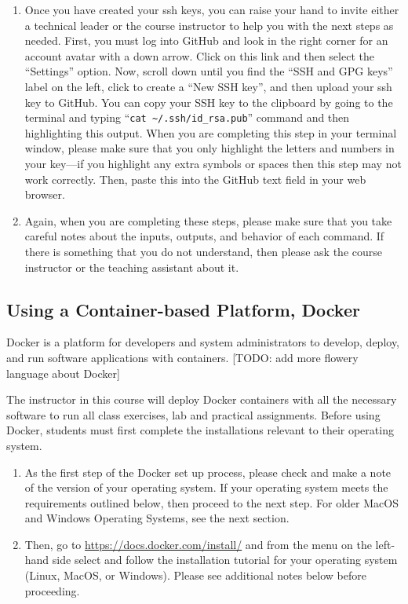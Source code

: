\begin{enumerate}
  \item Once you have created your ssh keys, you can raise your hand to invite either a technical leader or the
    course instructor to help you with the next steps as needed. First, you must log into GitHub and look in the right corner for
    an account avatar with a down arrow. Click on this link and then select the ``Settings'' option. Now, scroll down
    until you find the ``SSH and GPG keys'' label on the left, click to create a ``New SSH key'', and then upload your
    ssh key to GitHub. You can copy your SSH key to the clipboard by going to the terminal and typing ``{\tt cat
    \textasciitilde{}/.ssh/id\_rsa.pub}'' command and then highlighting this output. When you are completing this step
    in your terminal window, please make sure that you only highlight the letters and numbers in your key---if you
    highlight any extra symbols or spaces then this step may not work correctly. Then, paste this into the GitHub text
    field in your web browser.

  \item Again, when you are completing these steps, please make sure that you take careful notes about the inputs,
    outputs, and behavior of each command. If there is something that you do not understand, then please ask the course
    instructor or the teaching assistant about it.

\end{enumerate}

\vspace*{-.2in}
\subsection*{Using a Container-based Platform, Docker}
\vspace*{-.1in}

Docker is a platform for developers and system administrators to develop, deploy, and run software applications with containers. [TODO: add more flowery language about Docker]

The instructor in this course will deploy Docker containers with all the necessary software to run all class exercises, lab and practical assignments. Before using Docker, students must first complete the installations relevant to their operating system. 

\begin{enumerate}
	\item As the first step of the Docker set up process, please check and make a note of the version of your operating system. If your operating system meets the requirements outlined below, then proceed to the next step. For older MacOS and Windows Operating Systems, see the next section.
	\item Then, go to \url{https://docs.docker.com/install/} and  from the menu on the left-hand side select and follow the installation tutorial for your operating system (Linux, MacOS, or Windows). Please see additional notes below before proceeding.
\end{enumerate}

